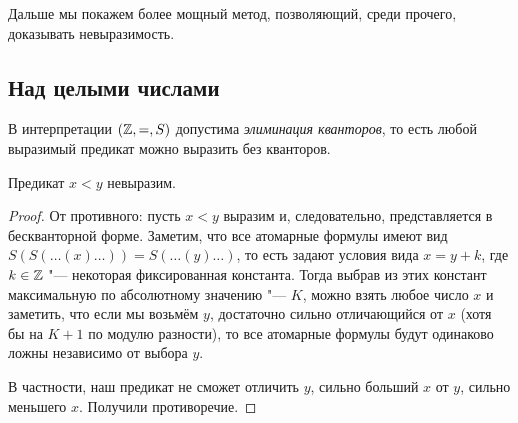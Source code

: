 Дальше мы покажем более мощный метод, позволяющий, среди прочего, доказывать невыразимость.

\subsection{Над целыми числами}
\begin{theorem}\label{elim_z_eq_s}
	В интерпретации $(\mathbb{Z}, =, S)$ допустима \textit{элиминация кванторов}, то есть любой выразимый предикат можно выразить без кванторов.
\end{theorem}
\begin{conseq}
	Предикат $x < y$ невыразим.
\end{conseq}
\begin{proof}
	От противного: пусть $x < y$ выразим и, следовательно, представляется в бескванторной форме.
	Заметим, что все атомарные формулы имеют вид $S(S(\dots(x)\dots)) = S(\dots(y)\dots)$,
	то есть задают условия вида $x=y+k$, где $k \in \mathbb{Z}$ "--- некоторая фиксированная константа.
	Тогда выбрав из этих констант максимальную по абсолютному значению "--- $K$, можно взять любое число
	$x$ и заметить, что если мы возьмём $y$, достаточно сильно отличающийся от $x$ (хотя бы на $K+1$ по модулю разности), то
	все атомарные формулы будут одинаково ложны независимо от выбора $y$.

	В частности, наш предикат не сможет отличить $y$, сильно больший $x$ от $y$, сильно меньшего $x$.
	Получили противоречие.
\end{proof}

